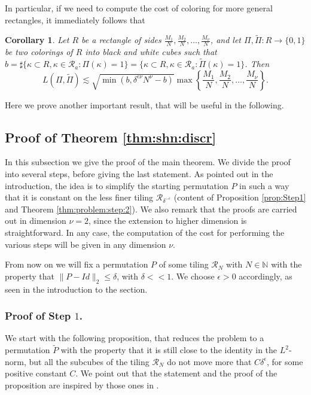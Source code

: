 \documentclass[12 pt]{article}
\theoremstyle{definition} \newtheorem{definition}{Definition}[section]
\theoremstyle{definition} \newtheorem{remark}[definition]{Remark}
\theoremstyle{plain} \newtheorem{lemma}[definition]{Lemma}
\theoremstyle{plain} \newtheorem{proposition}[definition]{Proposition}
\theoremstyle{plain} \newtheorem{theorem}[definition]{Theorem}
\theoremstyle{plain} \newtheorem{corollary}[definition]{Corollary}
\theoremstyle{definition} \newtheorem{example}[definition]{Example}
\theoremstyle{definition} \newtheorem{assumption}[definition]{Assumption}
\theoremstyle{definition} \newtheorem{conjecture}[definition]{Conjecture}
\newcommand{\N}{\mathbb{N}}
\newcommand{\1}{\mathbbm 1}
\numberwithin{equation}{section}
\begin{document}
In particular, if we need to compute the cost of coloring for more general rectangles, it immediately follows that
\begin{corollary}\label{cor:cost:coloring:rectangles}
    Let $R$ be a rectangle of sides $\frac{M_1}{N},\frac{M_2}{N},\dots,\frac{M_\nu}{N}$, and let $\Pi,\tilde\Pi:R\rightarrow\lbrace{0,1}\rbrace$ be two colorings of $R$ into black and white cubes such that $b=\sharp\lbrace \kappa\subset R,\kappa\in\mathcal{R}_a:\Pi(\kappa)=1\rbrace=\lbrace \kappa\subset R,\kappa\in\mathcal{R}_a:\tilde\Pi(\kappa)=1\rbrace$. Then 
    \begin{equation*}
       L(\Pi,\tilde \Pi)\lesssim \sqrt{\min({b, \delta^{\epsilon\nu}N^\nu}-b)}\max\left\lbrace \frac{M_1}{N},\frac{M_2}{N},\dots,\frac{M_\nu}{N}\right\rbrace.
   \end{equation*}
\end{corollary}
Here we prove another important result, that will be useful in the following. 

\subsection{Proof of Theorem \ref{thm:shn:discr}}\label{ss:main:thm}
In this subsection we give the proof of the main theorem. We divide the proof into several steps, before giving the last statement. As pointed out in the introduction, the idea is to simplify the starting permutation $P$ in such a way that it is constant on the less finer tiling $\mathcal{R}_{\delta^{-\epsilon}}$ (content of Proposition \ref{prop:Step1} and Theorem \ref{thm:problem:step:2}). We also remark that the proofs are carried out in dimension $\nu=2$, since the extension to higher dimension is straightforward. In any case, the computation of the cost for performing the various steps will be given in any dimension $\nu$. 

\medskip

 From now on we will fix a permutation $P$ of some tiling $\mathcal{R}_N$ with $N\in\N$ with the property that $\|P-Id\|_2\leq \delta$, with $\delta<<1$. We choose $\epsilon>0$ accordingly, as seen in the introduction to the section. 
 
 
 \subsubsection{Proof of Step $1$.}\label{sss:step:1}
 
 We start with the following proposition, that reduces the problem to a permutation $\tilde P$ with the property that it is still close to the identity in the $L^2$-norm, but all the subcubes of the tiling $\mathcal{R}_N$ do not move more that $C\delta^\epsilon$, for some positive constant $C$. We point out that the statement and the proof of the proposition are inspired by those ones in \cite{Shnirelman}. 
 
\end{document}
